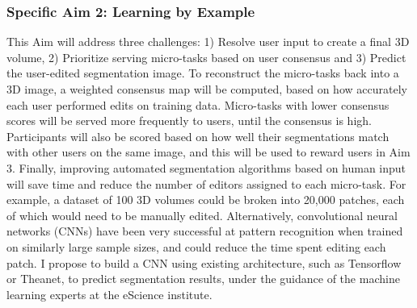 
\subsubsection*{Specific Aim 2: Learning by Example}
This Aim will address three challenges: 1) Resolve user input to create a final 3D volume, 2) Prioritize serving micro-tasks based on user consensus and 3) Predict the user-edited segmentation image. To reconstruct the micro-tasks back into a 3D image, a weighted consensus map will be computed, based on how accurately each user performed edits on training data. Micro-tasks with lower consensus scores will be served more frequently to users, until the consensus is high. Participants will also be scored based on how well their segmentations match with other users on the same image, and this will be used to reward users in Aim 3. Finally, improving automated segmentation algorithms based on human input will save time and reduce the number of editors assigned to each micro-task. For example, a dataset of 100 3D volumes could be broken into 20,000 patches, each of which would need to be manually edited. Alternatively, convolutional neural networks (CNNs) have been very successful at pattern recognition when trained on similarly large sample sizes, and could reduce the time spent editing each patch. I propose to build a CNN using existing architecture, such as Tensorflow or Theanet, to predict segmentation results, under the guidance of the machine learning experts at the eScience institute. 

